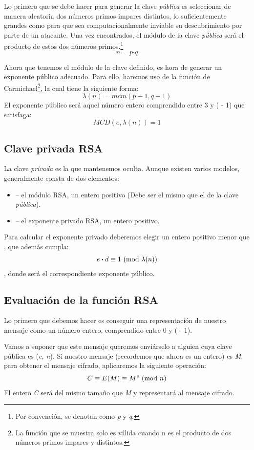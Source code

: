 Lo primero que se debe hacer para generar la clave \emph{pública} es seleccionar de manera aleatoria dos números primos impares distintos, lo suficientemente grandes como para que sea computacionalmente inviable su descubrimiento por parte de un atacante.
Una vez encontrados, el módulo  de la clave \emph{pública} será el producto de estos dos números primos.\footnote{Por convención, se denotan como \emph{p} y \emph{q}.}
\[ n = p \boldsymbol{\cdot} q \]

Ahora que tenemos el módulo de la clave definido, es hora de generar un exponente público  adecuado.
Para ello, haremos uso de la función de Carmichael\footnote{La función que se muestra solo es válida cuando n es el producto de dos números primos impares y distintos.}, la cual tiene la siguiente forma:
\[ \lambda(n) = mcm(p - 1, q - 1) \]
El exponente público  será aquel número entero comprendido entre 3 y ( - 1) que satisfaga:
\[ MCD(e, \lambda(n)) = 1 \] \emph{\parencite{Reference10}}

\subsection{Clave privada RSA}

La clave \emph{privada} es la que mantenemos oculta. Aunque existen varios modelos, generalmente consta de dos elementos:
\begin{itemize}
  \item {} -- el módulo RSA, un entero positivo (Debe ser el mismo que el de la clave \emph{pública}).
  \item {} -- el exponente privado RSA, un entero positivo.
\end{itemize}

Para calcular el exponente privado  deberemos elegir un entero positivo menor que , que además cumpla:
\[ e \boldsymbol{\cdot} d \equiv 1 \ (\mathrm{mod}\ \lambda(n)) \]
, donde  será el correspondiente exponente público. \emph{\parencite{Reference11}}

\subsection{Evaluación de la función RSA}

Lo primero que debemos hacer es conseguir una representación de nuestro mensaje como un número entero, comprendido entre 0 y ( - 1).

Vamos a suponer que este mensaje queremos enviárselo a alguien cuya clave pública es (\emph{e, n}).
Si nuestro mensaje (recordemos que ahora es un entero) es \emph{M}, para obtener el mensaje cifrado, aplicaremos la siguiente operación:
\[ C \equiv E(M) \equiv M^e \ (\mathrm{mod}\ n) \]
El entero \emph{C} será del mismo tamaño que \emph{M} y representará al mensaje cifrado.

